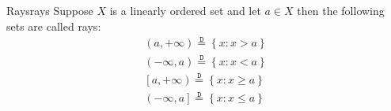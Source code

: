 \begin{definition}{Rays}{rays}
Suppose \( X \) is a linearly ordered set and let \( a \in  X \) then the
following sets are called rays:
\begin{gather*}
    \left( a, + \infty  \right) \stackrel{\mathtt{D}}{=} \left\{ x: x > a
    \right\} \\
    \left( - \infty , a \right) \stackrel{\mathtt{D}}{=} \left\{ x: x < a
    \right\} \\
    \left[ a, + \infty  \right) \stackrel{\mathtt{D}}{=} \left\{ x: x \ge  a
    \right\} \\
    \left( - \infty , a \right] \stackrel{\mathtt{D}}{=} \left\{ x: x \le  a
    \right\} \\
\end{gather*}
\end{definition}
